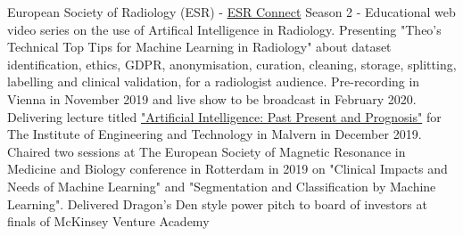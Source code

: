 %
%
%


\begin{scholarship}
					{European Society of Radiology (ESR) - \href{https://connect.myesr.org/}{ESR Connect} Season 2
					 - Educational web video series on the use of Artifical Intelligence in Radiology.
					 Presenting "Theo's Technical Top Tips for Machine Learning in Radiology" about dataset identification,
					 ethics, GDPR, anonymisation, curation, cleaning, storage, splitting, labelling and clinical validation, for a radiologist audience.
					 Pre-recording in Vienna in November 2019 and live show to be broadcast in February 2020.
					 }
					{Delivering lecture titled {\color{linkcolor}\href{https://communities.theiet.org/communities/events/item/155/77/23766}{"Artificial Intelligence: Past Present and Prognosis"}} for The Institute of
					 Engineering and Technology in Malvern in December 2019.}
					{Chaired two sessions at The European Society of Magnetic Resonance in Medicine and Biology conference
					 in Rotterdam in 2019 on "Clinical Impacts and Needs of Machine Learning" and
					 "Segmentation and Classification by Machine Learning".}
					{Delivered Dragon's Den style power pitch to board of investors at finals of McKinsey Venture Academy}

	\emptySeparator
\end{scholarship}